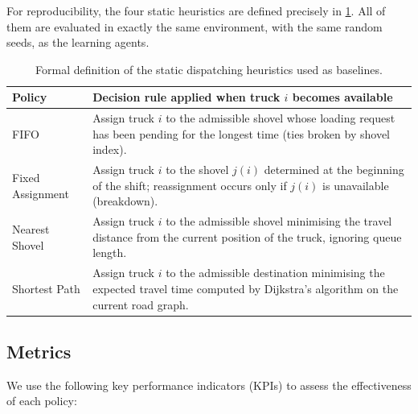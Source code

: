 \documentclass[11pt,a4paper]{article}
\begin{document}
For reproducibility, the four static heuristics are defined precisely in \cref{tab:baselines}. All of them are evaluated in exactly the same environment, with the same random seeds, as the learning agents.

\begin{table}[H]
\centering
\caption{Formal definition of the static dispatching heuristics used as baselines.}
\label{tab:baselines}
\small
\begin{tabularx}{\textwidth}{lX}
\toprule
\textbf{Policy} & \textbf{Decision rule applied when truck $i$ becomes available} \\
\midrule
FIFO             & Assign truck $i$ to the admissible shovel whose loading request has been pending for the longest time (ties broken by shovel index). \\
Fixed Assignment & Assign truck $i$ to the shovel $j(i)$ determined at the beginning of the shift; reassignment occurs only if $j(i)$ is unavailable (breakdown). \\
Nearest Shovel   & Assign truck $i$ to the admissible shovel minimising the travel distance from the current position of the truck, ignoring queue length. \\
Shortest Path    & Assign truck $i$ to the admissible destination minimising the expected travel time computed by Dijkstra's algorithm on the current road graph. \\
\bottomrule
\end{tabularx}
\end{table}

\subsection{Metrics}
\label{sec:metrics}

We use the following key performance indicators (KPIs) to assess the effectiveness of each policy:
\end{document}
